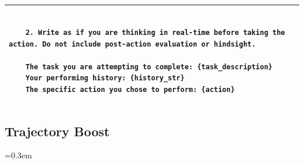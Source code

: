 \documentclass{article} %
\begin{document}
    \clearpage
    \vspace*{-\topskip}
    \vspace{0pt}
    \begin{table}[!t]
    \setlength{\aboverulesep}{0pt}
    \setlength{\belowrulesep}{0pt}
    \setlength{\extrarowheight}{0pt}
    \begin{tabular}{>{\setlength{\parskip}{0.2em}}p{}}
    \begin{lstlisting}[basicstyle=\ttfamily\small]
    
    2. Write as if you are thinking in real-time before taking the action. Do not include post-action evaluation or hindsight.

    The task you are attempting to complete: {task_description}
    Your performing history: {history_str}
    The specific action you chose to perform: {action}
    \end{lstlisting} \\
    \bottomrule
    \end{tabular}
    \end{table}


\subsection{Trajectory Boost}
\label{appendix: traj boost}


\setlength{\parindent}{0pt}

\spaceskip=0.3em
\end{document}
